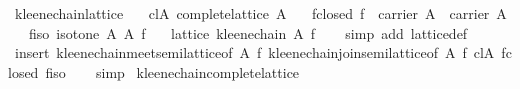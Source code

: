 \begin{isabellebody}
\isamarkupfalse%
%
\endisatagproof
{\isafoldproof}%
%
\isadelimproof
\isanewline
%
\endisadelimproof
\isanewline
{}\isamarkupfalse%
\ kleene{}chain{}lattice{}\isanewline
\ \ \ cl{}A{}\ {}complete{}lattice\ A{}\isanewline
\ \ \ f{}closed{}\ {}f\ {}\ carrier\ A\ {}\ carrier\ A{}\isanewline
\ \ \ f{}iso{}\ {}isotone\ A\ A\ f{}\isanewline
\ \ \ {}lattice\ {}kleene{}chain\ A\ f{}{}\isanewline
%
\isadelimproof
\ \ %
\endisadelimproof
%
\isatagproof
{}\isamarkupfalse%
\ {}simp\ add{}\ lattice{}def{}\isanewline
\ \ \isamarkupfalse%
\ {}insert\ kleene{}chain{}meet{}semilattice{}of\ A\ f{}\ kleene{}chain{}join{}semilattice{}of\ A\ f{}\ cl{}A\ f{}closed\ f{}iso{}\isanewline
\ \ \isamarkupfalse%
\ simp%
\endisatagproof
{\isafoldproof}%
%
\isadelimproof
\isanewline
%
\endisadelimproof
\isanewline
{}\isamarkupfalse%
\ kleene{}chain{}complete{}lattice{}\isanewline

\end{isabellebody}
